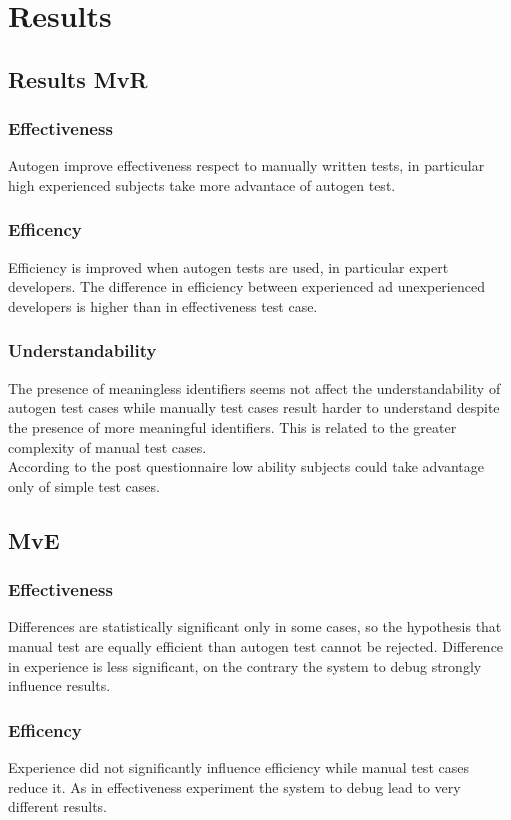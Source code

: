 \section{Results}
	\subsection{Results MvR}
	\subsubsection{Effectiveness}
		Autogen improve effectiveness respect to manually written tests, in particular high experienced subjects take more advantace of autogen test.
		
	\subsubsection{Efficency}
		Efficiency is improved when autogen tests are used, in particular expert developers. The difference in efficiency between experienced ad unexperienced developers is higher than in effectiveness test case.
	
	\subsubsection{Understandability}
	The presence of meaningless identifiers seems not affect the understandability of autogen test cases while manually test cases result harder to understand despite the presence of more meaningful identifiers. This is related to the greater complexity of manual test cases.\\
	According to the post questionnaire low ability subjects could take advantage only of simple test cases.
	
	\subsection{MvE}
	\subsubsection{Effectiveness}
		Differences are statistically significant only in some cases, so the hypothesis that manual test are equally efficient than autogen test cannot be rejected. Difference in experience is less significant, on the contrary the system to debug strongly influence results.
		
	\subsubsection{Efficency}
		Experience did not significantly influence efficiency while manual test cases reduce it. As in effectiveness experiment the system to debug lead to very different results.
		
